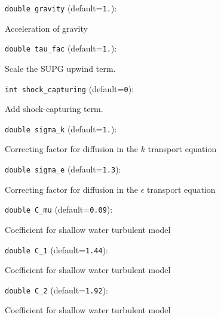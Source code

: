 \item\verb+double gravity+ {\rm(default=\verb|1.|)}:

Acceleration of gravity

\item\verb+double tau_fac+ {\rm(default=\verb|1.|)}:

Scale the SUPG upwind term. 

\item\verb+int shock_capturing+ {\rm(default=\verb|0|)}:

Add shock-capturing term.

\item\verb+double sigma_k+ {\rm(default=\verb|1.|)}:

Correcting factor for diffusion in the $k$ transport equation

\item\verb+double sigma_e+ {\rm(default=\verb|1.3|)}:

Correcting factor for diffusion in the $\epsilon$ transport equation

\item\verb+double C_mu+ {\rm(default=\verb|0.09|)}:

Coefficient for shallow water turbulent model

\item\verb+double C_1+ {\rm(default=\verb|1.44|)}:

Coefficient for shallow water turbulent model

\item\verb+double C_2+ {\rm(default=\verb|1.92|)}:

Coefficient for shallow water turbulent model


